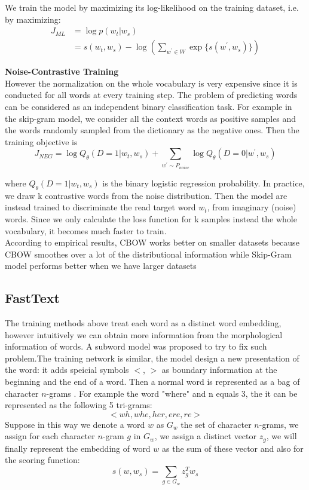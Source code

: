 We train the model by maximizing its log-likelihood on the training dataset, i.e. by maximizing:
\begin{align}
J_{ML} & = \log p(w_t| w_s)	\\
& = s(w_t, w_s) - \log(\sum_{w^\prime \in W} {\exp\{s(w^\prime, w_s)\}})	
\end{align}

\textbf{Noise-Contrastive Training}\\
However the normalization on the whole vocabulary is very expensive since it is conducted for all words at every training step. The problem of predicting words can be considered as an independent binary classification task. For example in the skip-gram model, we consider all the context words as positive samples and the words randomly sampled from the dictionary as the negative ones. Then the training objective is 
\[J_{NEG} = \log {Q_{\theta}{(D=1 | w_t, w_s)}} + \sum_{w^{\prime} \sim P_{noise}} {\log{Q_{\theta}{(D=0 | w^{\prime}, w_s )}}}  \]

where ${Q_{\theta}{(D=1| w_t, w_s)}}$ is the binary logistic regression probability. In practice, we draw k contrastive words from the noise distribution. Then the model are instead trained to discriminate the read target word $w_t$, from imaginary (noise) words. Since we only calculate the loss function for k samples instead the whole vocabulary, it becomes much faster to train.\\
According to  empirical results, CBOW works better on smaller datasets because CBOW smoothes over a lot of the distributional information while Skip-Gram model performs better when we have larger datasets



\subsection{FastText}
The training methods above treat each word as a distinct word embedding, however intuitively we can obtain more information from the morphological information of words. A subword model was proposed to try to fix such problem.The training network is similar, the model design a new presentation of the word: it adds speicial symbols $<$, ${>}$ as boundary information at the beginning and the end of a word. Then a normal word is represented as a bag of character $n$-grams . For example the word "where" and n equals 3, the it can be represented as the following 5 tri-grams: 
\[ <wh, whe, her, ere, re>\]
Suppose in this way we denote a word ${w}$ as ${G_{w}}$ the set of character ${n}$-grams, we assign for each character ${n}$-gram $g$ in ${G_{w}}$, we assign a distinct vector $z_g$, we will finally represent the embedding of word ${w}$ as the sum of these vector and also for the scoring function:
\[s(w, w_s) = \sum_{g \in G_{w}} z_g^{T} w_s \]
	
